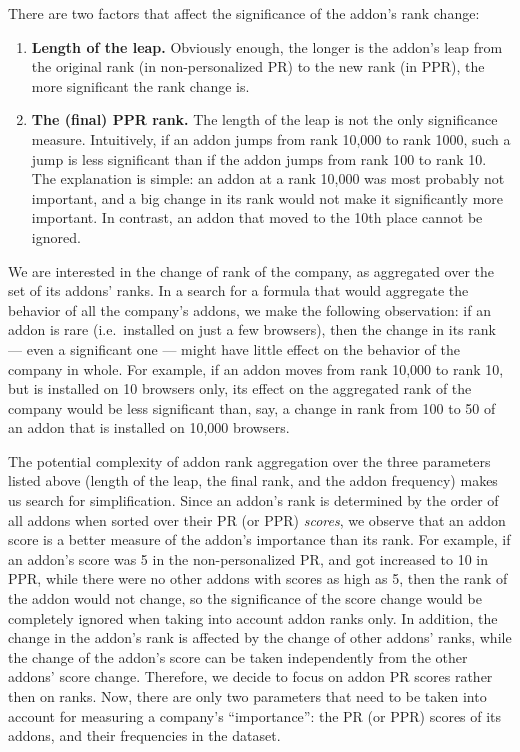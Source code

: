\documentclass[11pt,oneside]{book}
\begin{document}
There are two factors that affect the significance of the addon's rank change:
\begin{enumerate}
\item \textbf{Length of the leap.} Obviously enough, the longer is the addon's leap from the original rank (in non-personalized PR) to the new rank (in PPR), the more significant the rank change is.
\item \textbf{The (final) PPR rank.} The length of the leap is not the only significance measure. Intuitively, if an addon jumps from rank 10,000 to rank 1000, such a jump is less significant than if the addon jumps from rank 100 to rank 10. The explanation is simple: an addon at a rank 10,000 was most probably not important, and a big change in its rank would not make it significantly more important. In contrast, an addon that moved to the 10th place cannot be ignored.
\end{enumerate}

We are interested in the change of rank of the company, as aggregated over the set of its addons' ranks. In a search for a formula that would aggregate the behavior of all the company's addons, we make the following observation: if an addon is rare (i.e.~installed on just a few browsers), then the change in its rank --- even a significant one --- might have little effect on the behavior of the company in whole. For example, if an addon moves from rank 10,000 to rank 10, but is installed on 10 browsers only, its effect on the aggregated rank of the company would be less significant than, say, a change in rank from 100 to 50 of an addon that is installed on 10,000 browsers.

The potential complexity of addon rank aggregation over the three parameters listed above (length of the leap, the final rank, and the addon frequency) makes us search for simplification. Since an addon's rank is determined by the order of all addons when sorted over their PR (or PPR) \emph{scores}, we observe that an addon score is a better measure of the addon's importance than its rank. For example, if an addon's score was 5 in the non-personalized PR, and got increased to 10 in PPR, while there were no other addons with scores as high as 5, then the rank of the addon would not change, so the significance of the score change would be completely ignored when taking into account addon ranks only. In addition, the change in the addon's rank is affected by the change of other addons' ranks, while the change of the addon's score can be taken independently from the other addons' score change. Therefore, we decide to focus on addon PR scores rather then on ranks. Now, there are only two parameters that need to be taken into account for measuring a company's ``importance'': the PR (or PPR) scores of its addons, and their frequencies in the dataset.
\end{document}
